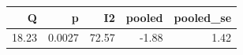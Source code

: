 \begin{tabular}{rrrrr}
\toprule
Q & p & I2 & pooled & pooled\_se \\
\midrule
18.23 & 0.0027 & 72.57 & -1.88 & 1.42 \\
\bottomrule
\end{tabular}
